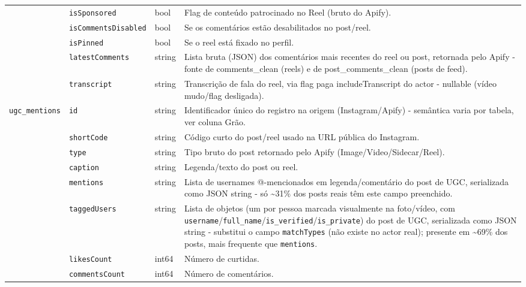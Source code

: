 \begin{footnotesize}
\begin{longtable}{p{3.2cm}p{3.0cm}p{2.0cm}p{6.0cm}}
\texttt{} & \texttt{isSponsored} & bool & Flag de conteúdo patrocinado no Reel (bruto do Apify). \\
\texttt{} & \texttt{isCommentsDisabled} & bool & Se os comentários estão desabilitados no post/\allowbreak{}reel. \\
\texttt{} & \texttt{isPinned} & bool & Se o reel está fixado no perfil. \\
\texttt{} & \texttt{latestComments} & string & Lista bruta (JSON) dos comentários mais recentes do reel ou post, retornada pelo Apify - fonte de comments\_\allowbreak{}clean (reels) e de post\_\allowbreak{}comments\_\allowbreak{}clean (posts de feed). \\
\texttt{} & \texttt{transcript} & string & Transcrição de fala do reel, via flag paga includeTranscript do actor - nullable (vídeo mudo/\allowbreak{}flag desligada). \\
\texttt{ugc\_\allowbreak{}mentions} & \texttt{id} & string & Identificador único do registro na origem (Instagram/\allowbreak{}Apify) - semântica varia por tabela, ver coluna Grão. \\
\texttt{} & \texttt{shortCode} & string & Código curto do post/\allowbreak{}reel usado na URL pública do Instagram. \\
\texttt{} & \texttt{type} & string & Tipo bruto do post retornado pelo Apify (Image/\allowbreak{}Video/\allowbreak{}Sidecar/\allowbreak{}Reel). \\
\texttt{} & \texttt{caption} & string & Legenda/\allowbreak{}texto do post ou reel. \\
\texttt{} & \texttt{mentions} & string & Lista de usernames @-mencionados em legenda/\allowbreak{}comentário do post de UGC, serializada como JSON string - só \textasciitilde{}31\% dos posts reais têm este campo preenchido. \\
\texttt{} & \texttt{taggedUsers} & string & Lista de objetos (um por pessoa marcada visualmente na foto/\allowbreak{}vídeo, com \texttt{username}/\allowbreak{}\texttt{full\_\allowbreak{}name}/\allowbreak{}\texttt{is\_\allowbreak{}verified}/\allowbreak{}\texttt{is\_\allowbreak{}private}) do post de UGC, serializada como JSON string - substitui o campo \texttt{matchTypes} (não existe no actor real); presente em \textasciitilde{}69\% dos posts, mais frequente que \texttt{mentions}. \\
\texttt{} & \texttt{likesCount} & int64 & Número de curtidas. \\
\texttt{} & \texttt{commentsCount} & int64 & Número de comentários. \\

\end{longtable}
\end{footnotesize}
